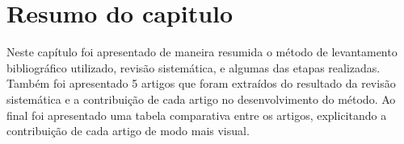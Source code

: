 \section{Resumo do capitulo}
\par
Neste capítulo foi apresentado de maneira resumida o método de levantamento bibliográfico utilizado, revisão sistemática, e algumas das etapas realizadas. Também foi apresentado 5 artigos que foram extraídos do resultado da revisão sistemática e a contribuição de cada artigo no desenvolvimento do método. Ao final foi apresentado uma tabela comparativa entre os artigos, explicitando a contribuição de cada artigo de modo mais visual.